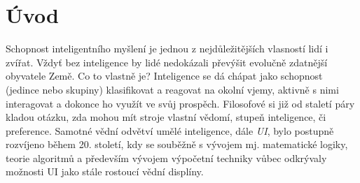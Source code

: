 \chapter{Úvod} 

Schopnost inteligentního myšlení je jednou z nejdůležitějších vlasností lidí i zvířat. Vždyť bez inteligence by lidé nedokázali převýšit evolučně zdatnější obyvatele Země. Co to vlastně je? Inteligence se dá chápat jako schopnost (jedince nebo skupiny) klasifikovat a reagovat na okolní vjemy, aktivně s nimi interagovat a dokonce ho využít ve svůj prospěch. Filosofové si již od staletí páry kladou otázku, zda mohou mít stroje vlastní vědomí, stupeň inteligence, či preference. Samotné vědní odvětví umělé inteligence, dále \textit{UI}, bylo postupně rozvíjeno během 20. století, kdy se souběžně s vývojem mj. matematické logiky, teorie algoritmů a především vývojem výpočetní techniky vůbec odkrývaly možnosti UI jako stále rostoucí vědní displíny.

